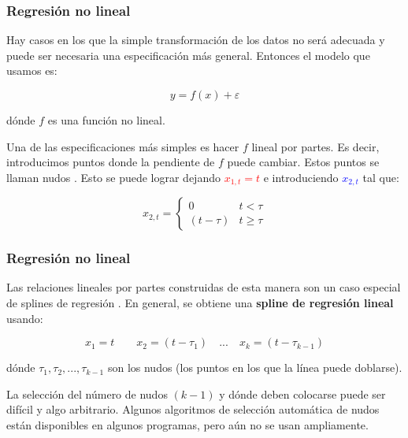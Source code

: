\documentclass[10pt]{beamer}
\begin{document}
\begin{frame}[fragile]
\frametitle{Regresión no lineal}

Hay casos en los que la simple transformación de los datos no será adecuada y puede ser necesaria una especificación más general. Entonces el modelo que usamos es:


\begin{equation}
y = f(x) + \varepsilon
\end{equation}


dónde $f$ es una función no lineal. 

\vspace{4mm}
\pause

Una de las especificaciones más simples es hacer $f$ lineal por partes. Es decir, introducimos puntos donde la pendiente de $f$ puede cambiar. Estos puntos se llaman nudos . Esto se puede lograr dejando \textcolor{red}{$x_{1,t} =t$} e introduciendo \textcolor{blue}{$x_{2,t}$} tal que:



\begin{equation}
x_{2,t} = 
   \begin{cases} 
        0 & t < \tau  \\
  (t-\tau) & t \geqslant \tau
   \end{cases}
\end{equation}


\end{frame}






\begin{frame}[fragile]
\frametitle{Regresión no lineal}


Las relaciones lineales por partes construidas de esta manera son un caso especial de splines de regresión . En general, se obtiene una \textbf{spline de regresión lineal} usando:


\begin{equation}
x_1 = t \quad \quad x_2 = (t-\tau_1) \quad ... \quad x_k = (t-\tau_{k-1})
\end{equation}

dónde $\tau_1, \tau_2, ..., \tau_{k-1}$ son los nudos (los puntos en los que la línea puede doblarse).

\vspace{4mm}
\pause

\begin{block}{}
\small La selección del número de nudos $(k - 1)$ y dónde deben colocarse puede ser difícil y algo arbitrario. Algunos algoritmos de selección automática de nudos están disponibles en algunos programas, pero aún no se usan ampliamente.
\end{block}


\end{frame}
\end{document}
